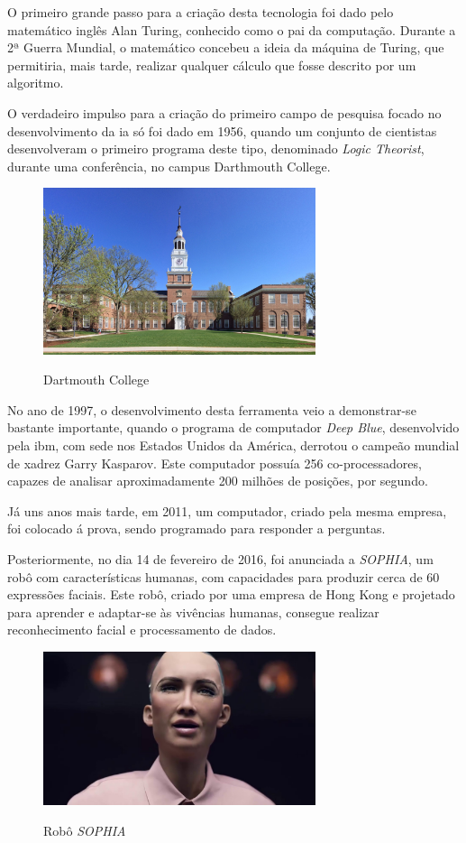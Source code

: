 \documentclass{report}
\begin{document}
\nocite{grafico3}

	O primeiro grande passo para a criação desta tecnologia foi dado pelo matemático inglês Alan Turing, conhecido como o pai da computação. Durante a 2ª Guerra Mundial, o matemático concebeu a ideia da máquina de Turing, que permitiria, mais tarde, realizar qualquer cálculo que fosse descrito por um algoritmo.

	O verdadeiro impulso para a criação do primeiro campo de pesquisa focado no desenvolvimento da \ac{ia} só foi dado em 1956, quando um conjunto de cientistas desenvolveram o primeiro programa deste tipo, denominado \textit{Logic Theorist}, durante uma conferência, no campus Darthmouth College.

\begin{figure}[H]
\caption{Dartmouth College}
\centering
\includegraphics[width=8cm]{imagens/DartmouthCollege.jpg}
\label{Dartmouth College}
\end{figure}

\nocite{college}

	No ano de 1997, o desenvolvimento desta ferramenta veio a demonstrar-se bastante importante, quando o programa de computador \textit{Deep Blue}, desenvolvido pela \ac{ibm}, com sede nos Estados Unidos da América, derrotou o campeão mundial de xadrez Garry Kasparov. Este computador possuía 256 co-processadores, capazes de analisar aproximadamente 200 milhões de posições, por segundo.

	Já uns anos mais tarde, em 2011, um  computador, criado pela mesma empresa, foi colocado á prova, sendo programado para responder a perguntas.

	Posteriormente, no dia 14 de fevereiro de 2016, foi anunciada a \textit{SOPHIA}, um robô com características humanas, com capacidades para produzir cerca de 60 expressões faciais. Este robô, criado por uma empresa de Hong Kong e projetado para aprender e adaptar-se às vivências humanas, consegue realizar reconhecimento facial e processamento de dados.
	
\begin{figure}[H]
\caption{Robô \textit{SOPHIA}}
\centering
\includegraphics[width=8cm]{imagens/SHOPIA.jpg}
\label{SOPHIA}
\end{figure}
\end{document}

